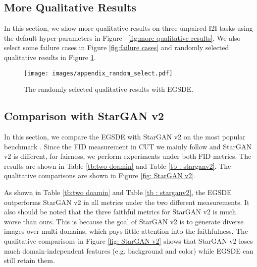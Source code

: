 \documentclass{article}
\begin{document}
\subsection{More Qualitative Results}
\label{sec:more resutls}
In this section, we show more qualitative results on three unpaired I2I tasks using the default hyper-parameters in Figure ~\ref{fig:more qualitative results}. We also select some failure cases in Figure \ref{fig:failure cases} and randomly selected qualitative results in Figure \ref{fig: random select}.
\begin{figure}
  \centering
  \texttt{[image: images/appendix\_random\_select.pdf]}
  \caption{The randomly selected qualitative results with EGSDE.}
  \vspace{-0.5cm}
  \label{fig: random select}
\end{figure}

\subsection{Comparison with StarGAN v2}
In this section, we compare the EGSDE with StarGAN v2\cite{choi2020stargan} on the most popular benchmark . Since the FID measurement in CUT we mainly follow and StarGAN v2 is different, for fairness, we perform experiments under both FID metrics. The results are shown in Table \ref{tb:two doamin}  and Table \ref{tb : starganv2}. The qualitative comparisons are shown in Figure \ref{fig: StarGAN v2}. 

As shown in Table  \ref{tb:two doamin}  and Table \ref{tb : starganv2}, the EGSDE outperforms StarGAN v2 in all metrics under the two different measurements. It also should be noted that the three faithful metrics for StarGAN v2 is much worse than ours. This is because the goal of StarGAN v2 is to generate diverse images over multi-domains, which pays little attention into the faithfulness.  The qualitative comparisons in Figure \ref{fig: StarGAN v2} shows that StarGAN v2 loses much domain-independent features (e.g. background and color) while EGSDE can still retain them.
\end{document}
